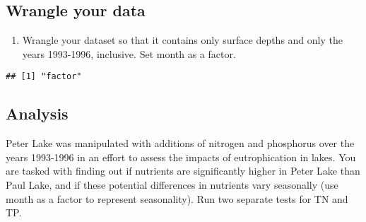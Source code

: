 \documentclass[]{article}
\newenvironment{Shaded}{\begin{snugshade}}{\end{snugshade}}
\newcommand{\KeywordTok}[1]{\textcolor[rgb]{0.13,0.29,0.53}{\textbf{#1}}}
\newcommand{\NormalTok}[1]{#1}
\newcommand{\OperatorTok}[1]{\textcolor[rgb]{0.81,0.36,0.00}{\textbf{#1}}}
\newcommand{\StringTok}[1]{\textcolor[rgb]{0.31,0.60,0.02}{#1}}
\providecommand{\tightlist}{%
  \setlength{\itemsep}{0pt}\setlength{\parskip}{0pt}}
\begin{document}
\hypertarget{wrangle-your-data}{%
\subsection{Wrangle your data}\label{wrangle-your-data}}

\begin{enumerate}
\def\labelenumi{\arabic{enumi}.}
\setcounter{enumi}{2}
\tightlist
\item
  Wrangle your dataset so that it contains only surface depths and only
  the years 1993-1996, inclusive. Set month as a factor.
\end{enumerate}

\begin{Shaded}
\end{Shaded}

\begin{verbatim}
## [1] "factor"
\end{verbatim}

\hypertarget{analysis}{%
\subsection{Analysis}\label{analysis}}

Peter Lake was manipulated with additions of nitrogen and phosphorus
over the years 1993-1996 in an effort to assess the impacts of
eutrophication in lakes. You are tasked with finding out if nutrients
are significantly higher in Peter Lake than Paul Lake, and if these
potential differences in nutrients vary seasonally (use month as a
factor to represent seasonality). Run two separate tests for TN and TP.
\end{document}
